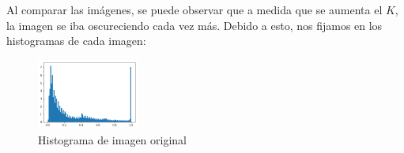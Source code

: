 \documentclass[10pt, a4paper]{article}
\begin{document}
\begin{figure}[H]
\begin{subfigure}{0.3\textwidth}
    \end{subfigure}\hfill
\end{figure}

Al comparar las imágenes, se puede observar que a medida que se aumenta el $K$, la imagen se iba oscureciendo cada vez más. Debido a esto, nos fijamos en los histogramas de cada imagen:

\begin{figure}[H]
	\centering
        \includegraphics[width=0.3\textwidth]{patitos1-histogramaOriginal.png}
        \caption{Histograma de imagen original}
\end{figure}
\end{document}

